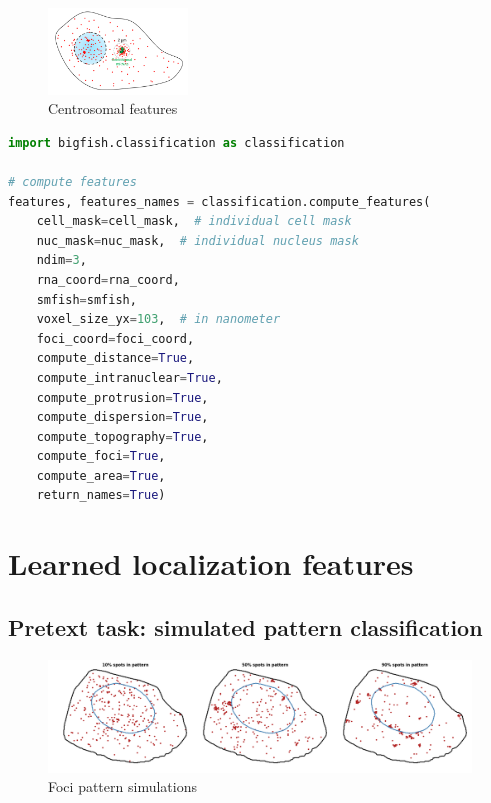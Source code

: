 \begin{figure}
  \begin{center}
    \includegraphics[width=0.33\textwidth]{figures/chapter4/centrosomal_features}
  \end{center}
  \caption{Centrosomal features}
  \label{fig:centrosome_features}
\end{figure}


\begin{minipage}{0.9\textwidth}
\begin{lstlisting}[language=Python]
import bigfish.classification as classification

# compute features
features, features_names = classification.compute_features(
    cell_mask=cell_mask,  # individual cell mask
	nuc_mask=nuc_mask,  # individual nucleus mask
	ndim=3,
	rna_coord=rna_coord,
    smfish=smfish,
	voxel_size_yx=103,  # in nanometer
    foci_coord=foci_coord,
    compute_distance=True,
    compute_intranuclear=True,
    compute_protrusion=True,
    compute_dispersion=True,
    compute_topography=True,
    compute_foci=True,
    compute_area=True,
    return_names=True)
\end{lstlisting}
\end{minipage}

\section{Learned localization features} \label{sec:learned_features}


\subsection{Pretext task: simulated pattern classification} \label{subsec:simulation_localization}


\begin{figure}[h]
    \centering
    \includegraphics[width=1\textwidth]{figures/chapter4/foci_panel}
    \caption{Foci pattern simulations}
    \label{fig:foci_panel}
\end{figure}

